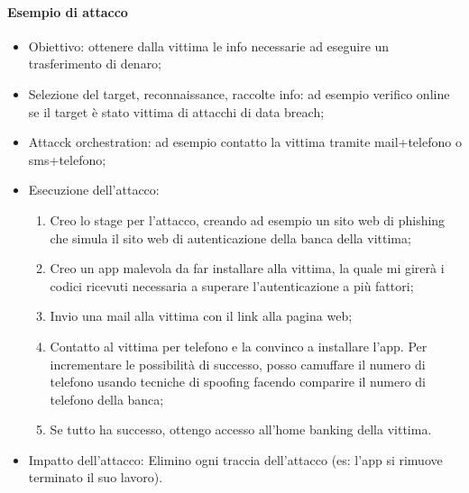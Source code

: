 \paragraph{Esempio di attacco}
\begin{itemize}
    \item  Obiettivo: ottenere dalla vittima le info necessarie ad eseguire un trasferimento di denaro;
    \item Selezione del target, reconnaissance, raccolte info: ad esempio verifico online se il target è stato vittima di attacchi di data breach;
    \item Attacck orchestration: ad esempio contatto la vittima tramite mail+telefono o sms+telefono;
    \item Esecuzione dell'attacco: 
	\begin{enumerate}
	    \item  Creo lo stage per l'attacco, creando ad esempio un sito web di phishing che simula il sito web di autenticazione della banca della vittima;
	    \item Creo un app malevola da far installare alla vittima, la quale mi girerà i codici ricevuti necessaria a superare l'autenticazione a più fattori;
	    \item Invio una mail alla vittima con il link alla pagina web;
	    \item  Contatto al vittima per telefono e la convinco a installare l'app. Per incrementare le possibilità di successo, posso camuffare il numero di telefono usando tecniche di spoofing facendo comparire il numero di telefono della banca;
	    \item  Se tutto ha successo, ottengo accesso all'home banking della vittima. 
	\end{enumerate}
    \item Impatto dell'attacco: Elimino ogni traccia dell'attacco (es: l'app si rimuove terminato il suo lavoro).
\end{itemize}


